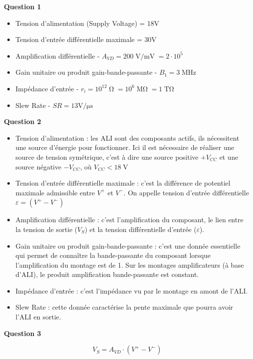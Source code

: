 \documentclass[a4paper,french]{paper}
\begin{document}
\textbf{Question 1}

\begin{itemize}
	\item Tension d'alimentation (Supply Voltage) = 18V
	\item Tension d'entrée différentielle maximale = 30V
	\item Amplification différentielle - $A_{VD} = 200\operatorname{V/mV} = 2 \cdot 10^5$
	\item Gain unitaire ou produit gain-bande-passante - $B_1 = 3\operatorname{MHz}$ 
	\item Impédance d'entrée - $r_i = 10^{12}\operatorname{\Omega} = 10^6\operatorname{M\Omega} = 1\operatorname{T\Omega}$
	\item Slew Rate - $SR = 13\operatorname{V/\mu{}s}$
\end{itemize}

\textbf{Question 2}

\begin{itemize}
	\item Tension d'alimentation : les ALI sont des composants actifs, ils nécessitent une source d'énergie pour fonctionner. Ici il est nécessaire de réaliser une source de tension symétrique, c'est à dire une source positive $+V_{CC}$ et une source négative $-V_{CC}$, où $V_{CC} < 18\operatorname{V}$
	\item Tension d'entrée différentielle maximale : c'est la différence de potentiel maximale admissible entre $V^+$ et $V^-$. On appelle tension d'entrée différentielle $\varepsilon = (V^+ - V^-)$
	\item Amplification différentielle : c'est l'amplification du composant, le lien entre la tension de sortie ($V_S$) et la tension différentielle d'entrée ($\varepsilon$).
	\item Gain unitaire ou produit gain-bande-passante : c'est une donnée essentielle qui permet de connaître la bande-passante du composant lorsque l'amplification du montage est de 1. Sur les montages amplificateurs (à base d'ALI), le produit amplification bande-passante est constant. 
	\item Impédance d'entrée : c'est l'impédance vu par le montage en amont de l'ALI.
	\item Slew Rate : cette donnée caractérise la pente maximale que pourra avoir l'ALI en sortie.
\end{itemize}

\textbf{Question 3}

$$V_S = A_{VD} \cdot (V^+ - V^-)$$
\end{document}
